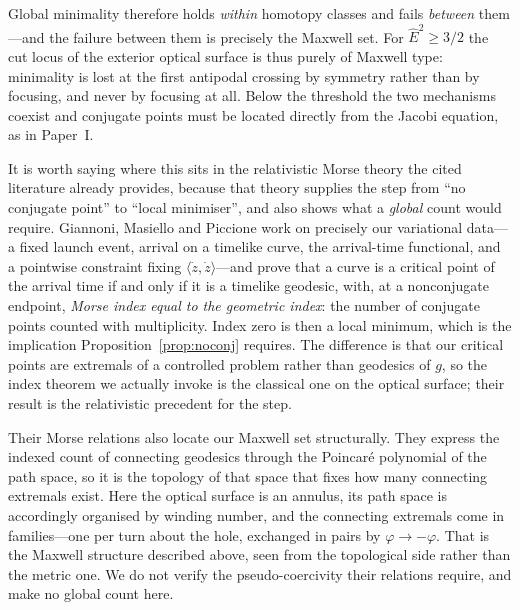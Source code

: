 \documentclass[12pt]{iopart}
\theoremstyle{plain}
\theoremstyle{definition}
\theoremstyle{remark}
\newcommand{\Ehat}{\hat E}
\begin{document}
Global minimality therefore holds \emph{within} homotopy classes and fails
\emph{between} them---and the failure between them is precisely the Maxwell set.
For $\Ehat^2\ge3/2$ the cut locus of the exterior optical surface is thus purely
of Maxwell type: minimality is lost at the first antipodal crossing by symmetry
rather than by focusing, and never by focusing at all. Below the
threshold the two mechanisms coexist and conjugate points must be located
directly from the Jacobi equation, as in Paper~I.

It is worth saying where this sits in the relativistic Morse theory the cited
literature already provides, because that theory supplies the step from ``no
conjugate point'' to ``local minimiser'', and also shows what a \emph{global}
count would require. Giannoni, Masiello and Piccione
\cite{GiannoniMasielloPiccione2000} work on precisely our variational data---a
fixed launch event, arrival on a timelike curve, the arrival-time functional, and
a pointwise constraint fixing $\langle\dot z,\dot z\rangle$---and prove that a
curve is a critical point of the arrival time if and only if it is a timelike
geodesic, with, at a nonconjugate endpoint, \emph{Morse index equal to the
geometric index}: the number of conjugate points counted with multiplicity. Index
zero is then a local minimum, which is the implication
Proposition~\ref{prop:noconj} requires. The difference is that our critical
points are extremals of a controlled problem rather than geodesics of $g$, so the
index theorem we actually invoke is the classical one on the optical surface;
their result is the relativistic precedent for the step.

Their Morse relations also locate our Maxwell set structurally. They express the
indexed count of connecting geodesics through the Poincar\'e polynomial of the
path space, so it is the topology of that space that fixes how many connecting
extremals exist. Here the optical surface is an annulus, its path space is
accordingly organised by winding number, and the connecting extremals come in
families---one per turn about the hole, exchanged in pairs by
$\varphi\to-\varphi$. That is the Maxwell structure described above, seen from
the topological side rather than the metric one. We do not verify the
pseudo-coercivity their relations require, and make no global count here.
\end{document}
